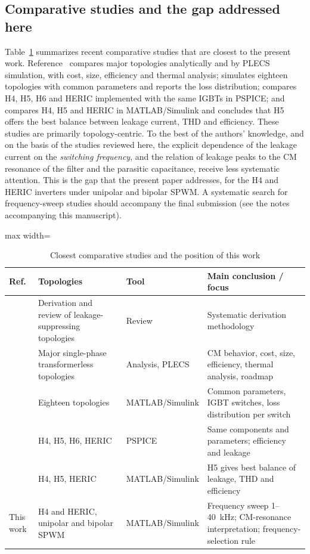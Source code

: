 \subsection{Comparative studies and the gap addressed here}
Table~\ref{tab:related} summarizes recent comparative studies that are closest to the present work. Reference~\cite{Khan2020} compares major topologies analytically and by PLECS simulation, with cost, size, efficiency and thermal analysis; \cite{Kibria2023} simulates eighteen topologies with common parameters and reports the loss distribution; \cite{Kolodziejski2023} compares H4, H5, H6 and HERIC implemented with the same IGBTs in PSPICE; and \cite{Shrestha2025} compares H4, H5 and HERIC in MATLAB/\-Simulink and concludes that H5 offers the best balance between leakage current, THD and efficiency. These studies are primarily topology-centric. To the best of the authors' knowledge, and on the basis of the studies reviewed here, the explicit dependence of the leakage current on the \emph{switching frequency}, and the relation of leakage peaks to the CM resonance of the filter and the parasitic capacitance, receive less systematic attention. This is the gap that the present paper addresses, for the H4 and HERIC inverters under unipolar and bipolar SPWM. A systematic search for frequency-sweep studies should accompany the final submission (see the notes accompanying this manuscript).

\begin{table}[!t]
\renewcommand{\arraystretch}{1.2}
\caption{Closest comparative studies and the position of this work}
\label{tab:related}
\centering
\footnotesize
\begin{adjustbox}{max width=\textwidth}
\begin{tabular}{p{1.4cm}p{3.0cm}p{2.6cm}p{6.2cm}}
\toprule
Ref. & Topologies & Tool & Main conclusion / focus \\
\midrule
\cite{Li2015} & Derivation and review of leakage-suppressing topologies & Review & Systematic derivation methodology \\
\cite{Khan2020} & Major single-phase transformerless topologies & Analysis, PLECS & CM behavior, cost, size, efficiency, thermal analysis, roadmap \\
\cite{Kibria2023} & Eighteen topologies & MATLAB/\-Simulink & Common parameters, IGBT switches, loss distribution per switch \\
\cite{Kolodziejski2023} & H4, H5, H6, HERIC & PSPICE & Same components and parameters; efficiency and leakage \\
\cite{Shrestha2025} & H4, H5, HERIC & MATLAB/\-Simulink & H5 gives best balance of leakage, THD and efficiency \\
This work & H4 and HERIC, unipolar and bipolar SPWM & MATLAB/\-Simulink & Frequency sweep 1--40~kHz; CM-resonance interpretation; frequency-selection rule \\
\bottomrule
\end{tabular}
\end{adjustbox}
\end{table}


